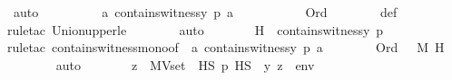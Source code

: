 \begin{isabellebody}
\ auto\ \isanewline
\ \ \ \ \isamarkupfalse%
\ \isamarkupfalse%
\ {\isachardoublequoteopen}{\isacharparenleft}{\kern0pt}{\isasymmu}\ a{\isachardot}{\kern0pt}\ contains{\isacharunderscore}{\kern0pt}witness{\isacharparenleft}{\kern0pt}y{\isacharcomma}{\kern0pt}\ p{\isacharcomma}{\kern0pt}\ a{\isacharparenright}{\kern0pt}{\isacharparenright}{\kern0pt}\ {\isasymle}\ {\isasymalpha}{\isachardoublequoteclose}\ \isanewline
\ \ \ \ \ \ \isamarkupfalse%
\ {\isacartoucheopen}Ord{\isacharparenleft}{\kern0pt}{\isasymalpha}{\isacharparenright}{\kern0pt}{\isacartoucheclose}\isanewline
\ \ \ \ \ \ \isamarkupfalse%
\ {\isasymalpha}{\isacharunderscore}{\kern0pt}def\isanewline
\ \ \ \ \ \ \isamarkupfalse%
{\isacharparenleft}{\kern0pt}rule{\isacharunderscore}{\kern0pt}tac\ Union{\isacharunderscore}{\kern0pt}upper{\isacharunderscore}{\kern0pt}le{\isacharparenright}{\kern0pt}\isanewline
\ \ \ \ \ \ \isamarkupfalse%
\ auto\isanewline
\ \ \ \ \isamarkupfalse%
\ \isamarkupfalse%
\ H{\isacharprime}{\kern0pt}\ {\isacharcolon}{\kern0pt}\ {\isachardoublequoteopen}contains{\isacharunderscore}{\kern0pt}witness{\isacharparenleft}{\kern0pt}y{\isacharcomma}{\kern0pt}\ p{\isacharcomma}{\kern0pt}\ {\isasymalpha}{\isacharparenright}{\kern0pt}{\isachardoublequoteclose}\ \isanewline
\ \ \ \ \ \ \isamarkupfalse%
{\isacharparenleft}{\kern0pt}rule{\isacharunderscore}{\kern0pt}tac\ contains{\isacharunderscore}{\kern0pt}witness{\isacharunderscore}{\kern0pt}mono{\isacharbrackleft}{\kern0pt}of\ {\isachardoublequoteopen}{\isacharparenleft}{\kern0pt}{\isasymmu}\ a{\isachardot}{\kern0pt}\ contains{\isacharunderscore}{\kern0pt}witness{\isacharparenleft}{\kern0pt}y{\isacharcomma}{\kern0pt}\ p{\isacharcomma}{\kern0pt}\ a{\isacharparenright}{\kern0pt}{\isacharparenright}{\kern0pt}{\isachardoublequoteclose}{\isacharbrackright}{\kern0pt}{\isacharparenright}{\kern0pt}\isanewline
\ \ \ \ \ \ \isamarkupfalse%
\ {\isacartoucheopen}Ord{\isacharparenleft}{\kern0pt}{\isasymalpha}{\isacharparenright}{\kern0pt}{\isacartoucheclose}\ {\isacartoucheopen}{\isasymalpha}\ {\isasymin}\ M{\isacartoucheclose}\ H\isanewline
\ \ \ \ \ \ \isamarkupfalse%
\ auto\isanewline
\isanewline
\ \ \ \ \isamarkupfalse%
\ \isamarkupfalse%
\ {\isachardoublequoteopen}{\isacharparenleft}{\kern0pt}{\isasymexists}z\ {\isasymin}\ MVset{\isacharparenleft}{\kern0pt}{\isasymalpha}{\isacharparenright}{\kern0pt}\ {\isasyminter}\ HS{\isachardot}{\kern0pt}\ p\ {\isasymtturnstile}HS\ {\isasymphi}\ {\isacharparenleft}{\kern0pt}{\isacharbrackleft}{\kern0pt}y{\isacharcomma}{\kern0pt}\ z{\isacharbrackright}{\kern0pt}\ {\isacharat}{\kern0pt}\ env{\isacharparenright}{\kern0pt}{\isacharparenright}{\kern0pt}{\isachardoublequoteclose}\ \isanewline

\end{isabellebody}
